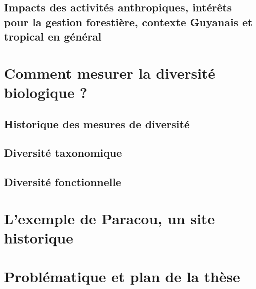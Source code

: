 \documentclass[
  11pt,
  french,
  A4paper,
  extrafontsizes,onecolumn,openright
  ]{memoir}
\begin{document}
\section{Impacts des activités anthropiques, intérêts pour la gestion
forestière, contexte Guyanais et tropical en
général}\label{impacts-des-activites-anthropiques-interets-pour-la-gestion-forestiere-contexte-guyanais-et-tropical-en-general}

\chapter{Comment mesurer la diversité biologique
?}\label{comment-mesurer-la-diversite-biologique}

\section{Historique des mesures de
diversité}\label{historique-des-mesures-de-diversite}

\section{Diversité taxonomique}\label{diversite-taxonomique}

\section{Diversité fonctionnelle}\label{diversite-fonctionnelle}

\chapter{L'exemple de Paracou, un site
historique}\label{lexemple-de-paracou-un-site-historique}

\chapter{Problématique et plan de la
thèse}\label{problematique-et-plan-de-la-these}



\backmatter
\SmallMargins

%
\printbibliography






\end{document}
